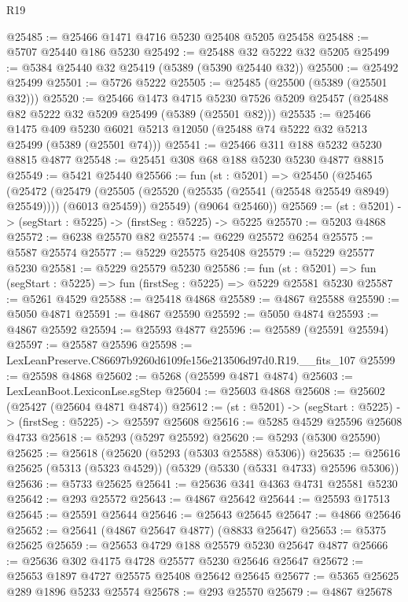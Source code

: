\begin{lexlean}{R19}
\begin{coremodule}
@25485 := @25466 @1471 @4716 @5230 @25408 @5205 @25458
@25488 := @5707 @25440 @186 @5230
@25492 := @25488 @32 @5222 @32 @5205
@25499 := @5384 @25440 @32 @25419 (@5389 (@5390 @25440 @32))
@25500 := @25492 @25499
@25501 := @5726 @5222
@25505 := @25485 (@25500 (@5389 (@25501 @32)))
@25520 := @25466
    @1473
    @4715
    @5230
    @7526
    @5209
    @25457
    (@25488 @82 @5222 @32 @5209 @25499 (@5389 (@25501 @82)))
@25535 := @25466
    @1475
    @409
    @5230
    @6021
    @5213
    @12050
    (@25488 @74 @5222 @32 @5213 @25499 (@5389 (@25501 @74)))
@25541 := @25466 @311 @188 @5232 @5230 @8815 @4877
@25548 := @25451 @308 @68 @188 @5230 @5230 @4877 @8815
@25549 := @5421 @25440
@25566 := fun (st : @5201) =>
  @25450
    (@25465
      (@25472
        (@25479 (@25505 (@25520 (@25535 (@25541 (@25548 @25549 @8949) @25549)))) (@6013 @25459))
        @25549)
      (@9064 @25460))
@25569 := (st : @5201) -> (segStart : @5225) -> (firstSeg : @5225) -> @5225
@25570 := @5203 @4868
@25572 := @6238 @25570 @82
@25574 := @6229 @25572 @6254
@25575 := @5587 @25574
@25577 := @5229 @25575 @25408
@25579 := @5229 @25577 @5230
@25581 := @5229 @25579 @5230
@25586 := fun (st : @5201) => fun (segStart : @5225) => fun (firstSeg : @5225) => @5229 @25581 @5230
@25587 := @5261 @4529
@25588 := @25418 @4868
@25589 := @4867 @25588
@25590 := @5050 @4871
@25591 := @4867 @25590
@25592 := @5050 @4874
@25593 := @4867 @25592
@25594 := @25593 @4877
@25596 := @25589 (@25591 @25594)
@25597 := @25587 @25596
@25598 := LexLeanPreserve.C86697b9260d6109fe156e213506d97d0.R19.__fits_107
@25599 := @25598 @4868
@25602 := @5268 (@25599 @4871 @4874)
@25603 := LexLeanBoot.LexiconLse.sgStep
@25604 := @25603 @4868
@25608 := @25602 (@25427 (@25604 @4871 @4874))
@25612 := (st : @5201) -> (segStart : @5225) -> (firstSeg : @5225) -> @25597 @25608
@25616 := @5285 @4529 @25596 @25608 @4733
@25618 := @5293 (@5297 @25592)
@25620 := @5293 (@5300 @25590)
@25625 := @25618 (@25620 (@5293 (@5303 @25588) @5306))
@25635 := @25616 @25625 (@5313 (@5323 @4529)) (@5329 (@5330 (@5331 @4733) @25596 @5306))
@25636 := @5733 @25625
@25641 := @25636 @341 @4363 @4731 @25581 @5230
@25642 := @293 @25572
@25643 := @4867 @25642
@25644 := @25593 @17513
@25645 := @25591 @25644
@25646 := @25643 @25645
@25647 := @4866 @25646
@25652 := @25641 (@4867 @25647 @4877) (@8833 @25647)
@25653 := @5375 @25625
@25659 := @25653 @4729 @188 @25579 @5230 @25647 @4877
@25666 := @25636 @302 @4175 @4728 @25577 @5230 @25646 @25647
@25672 := @25653 @1897 @4727 @25575 @25408 @25642 @25645
@25677 := @5365 @25625 @289 @1896 @5233 @25574
@25678 := @293 @25570
@25679 := @4867 @25678

\end{coremodule}
\end{lexlean}
